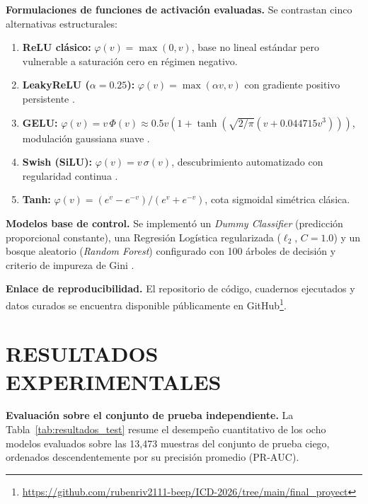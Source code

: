 \documentclass[10pt,twocolumn,letterpaper]{article}
\newcommand{\PRAUC}{\mathrm{PR\text{-}AUC}}
\begin{document}
\textbf{Formulaciones de funciones de activación evaluadas.}
Se contrastan cinco alternativas estructurales:
\begin{enumerate}[leftmargin=1.2em]
  \item \textbf{ReLU clásico:} $\varphi(v) = \max(0, v)$, base no lineal estándar pero vulnerable a saturación cero en régimen negativo.
  \item \textbf{LeakyReLU ($\alpha=0.25$):} $\varphi(v) = \max(\alpha v, v)$ con gradiente positivo persistente \citep{maas2013}.
  \item \textbf{GELU:} $\varphi(v) = v\,\Phi(v) \approx 0.5v\left(1+\tanh\left(\sqrt{2/\pi}(v+0.044715v^3)\right)\right)$, modulación gaussiana suave \citep{hendrycks2016}.
  \item \textbf{Swish (SiLU):} $\varphi(v) = v\,\sigma(v)$, descubrimiento automatizado con regularidad continua \citep{ramachandran2018}.
  \item \textbf{Tanh:} $\varphi(v) = (e^v - e^{-v})/(e^v + e^{-v})$, cota sigmoidal simétrica clásica.
\end{enumerate}

\textbf{Modelos base de control.}
Se implementó un \emph{Dummy Classifier} (predicción proporcional constante), una Regresión Logística regularizada ($\ell_2$, $C=1.0$) y un bosque aleatorio (\emph{Random Forest}) configurado con 100 árboles de decisión y criterio de impureza de Gini \citep{breiman2001}.

\textbf{Enlace de reproducibilidad.} El repositorio de código, cuadernos ejecutados y datos curados se encuentra disponible públicamente en GitHub\footnote{\url{https://github.com/rubenriv2111-beep/ICD-2026/tree/main/final_proyect}}.

\section{RESULTADOS EXPERIMENTALES}

\textbf{Evaluación sobre el conjunto de prueba independiente.}
La Tabla~\ref{tab:resultados_test} resume el desempeño cuantitativo de los ocho modelos evaluados sobre las 13{,}473 muestras del conjunto de prueba ciego, ordenados descendentemente por su precisión promedio ($\PRAUC$).
\end{document}
